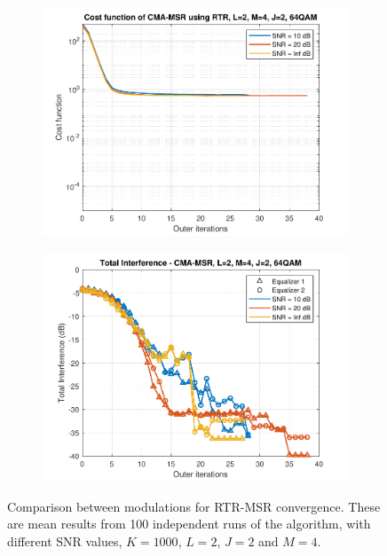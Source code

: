 \begin{figure}
\begin{subfigure}[b]{0.45\textwidth}
		\includegraphics[width=\linewidth]{./figs/BF_RTR_MSR_cost_64QAM_L=2_M=4_J=2_K=1000.pdf}
		\label{fig:rtr_msr_cost64}
	\end{subfigure}
	\begin{subfigure}[b]{0.45\textwidth}
		\includegraphics[width=\linewidth]{./figs/BF_RTR_MSR_TI_64QAM_L=2_M=4_J=2_K=1000.pdf}
		\label{fig:rtr_msr_ti64}
	\end{subfigure}
	\caption{Comparison between modulations for RTR-MSR convergence. These are mean results from 100 independent runs of the algorithm, with different SNR values, $K=1000$, $L=2$, $J=2$ and $M=4$.}
	\label{fig:CMA_RTR_msr_mods_L2M4}
\end{figure}


